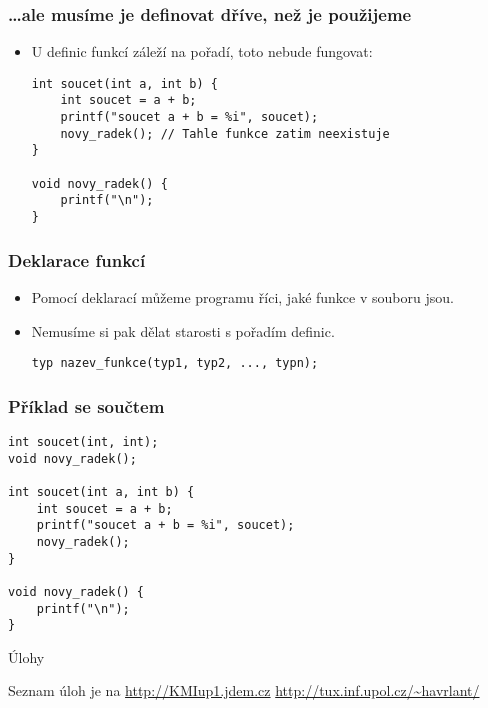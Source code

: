 \documentclass{beamer}
\newenvironment{itemizex}%
  {\large \begin{itemize}%
    \setlength{\itemsep}{8pt}%
    \setlength{\parskip}{8pt}}%
  {\end{itemize}}
\begin{document}
\begin{frame}[t,fragile]\frametitle{\dots ale musíme je definovat dříve, než je použijeme} 
    \begin{itemizex}
        \item U definic funkcí záleží na pořadí, toto nebude fungovat:
        \begin{verbatim} 
int soucet(int a, int b) {
    int soucet = a + b;
    printf("soucet a + b = %i", soucet);
    novy_radek(); // Tahle funkce zatim neexistuje
}

void novy_radek() {
    printf("\n");
}
        \end{verbatim}
    \end{itemizex}
\end{frame}


\begin{frame}[t,fragile]\frametitle{Deklarace funkcí} 
    \begin{itemizex}
        \item Pomocí deklarací můžeme programu říci, jaké funkce v souboru jsou.
        \item Nemusíme si pak dělat starosti s pořadím definic. 
        \begin{verbatim} 
typ nazev_funkce(typ1, typ2, ..., typn);
        \end{verbatim}
    \end{itemizex}
\end{frame}


\begin{frame}[t,fragile]\frametitle{Příklad se součtem} 
    \begin{verbatim} 
int soucet(int, int);
void novy_radek();

int soucet(int a, int b) {
    int soucet = a + b;
    printf("soucet a + b = %i", soucet);
    novy_radek();
}

void novy_radek() {
    printf("\n");
}
    \end{verbatim}
\end{frame}


\begin{frame}[t,fragile]{Úlohy}
\begin{center}
\vskip 1cm
{\Large Seznam úloh je na \url{http://KMIup1.jdem.cz}}
\vskip 2cm
\url{http://tux.inf.upol.cz/~havrlant/}
\end{center}
\end{frame}
\end{document}
